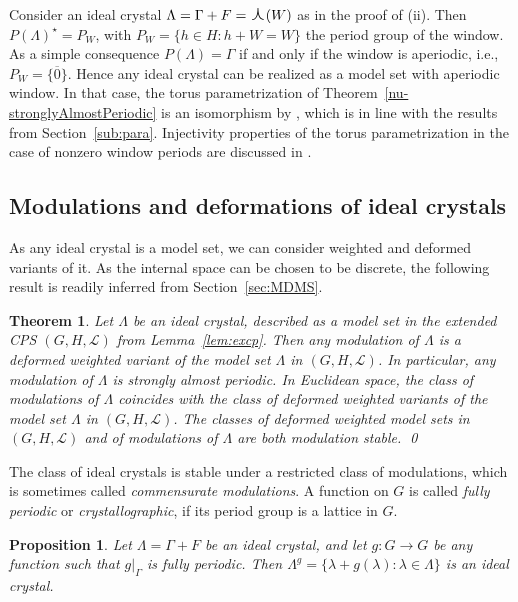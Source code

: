 \documentclass[11pt, a4wide]{amsart}
\newcommand{\oplam}{\mbox{\Large $\curlywedge$}}
\newcommand{\cL}{\mathcal L}
\newtheorem{theorem}[lemma]{Theorem}
\newtheorem{proposition}[lemma]{Proposition}
\numberwithin{lemma}{section}
\begin{document}
Consider an ideal crystal $\Lambda=\Gamma+F=\oplam(W)$ as in the proof of (ii). Then $P(\Lambda)^\star=P_W$, with $P_W=\{h\in H: h+W=W\}$ the period group of the window. As a simple consequence $P(\Lambda)=\Gamma$ if and only if the window is aperiodic, i.e., $P_W=\{\overline{0}\}$. Hence any ideal crystal can be realized as a model set with aperiodic window.
In that case, the torus parametrization of Theorem~\ref{nu-stronglyAlmostPeriodic} is an isomorphism by \cite[Prop.~13.2]{LR}, which is in line with the results from Section~\ref{sub:para}. Injectivity properties of the torus parametrization in the case of nonzero window periods are discussed in \cite{KR17}.

\subsection{Modulations and deformations of ideal crystals}

As any ideal crystal is a model set, we can consider weighted and deformed variants of it. As the internal space can be chosen to be discrete, the following result is readily inferred from Section~\ref{sec:MDMS}.

\begin{theorem}
Let $\Lambda$ be an ideal crystal, described as a model set in the extended CPS $(G,H, \cL)$ from Lemma~\ref{lem:excp}. Then any modulation of $\Lambda$ is a deformed weighted variant of  the model set $\Lambda$ in $(G,H,\cL)$.  In particular,  any modulation of $\Lambda$ is strongly almost periodic.    In Euclidean space, the class of modulations of $\Lambda$ coincides with the class of deformed weighted variants of the model set $\Lambda$ in $(G,H, \cL)$. The classes of deformed weighted model sets in $(G,H,\cL)$ and of modulations of $\Lambda$ are both modulation stable. \qed
\end{theorem}



\smallskip

The class of ideal crystals is stable under a restricted class of modulations, which is sometimes called \textit{commensurate modulations}. A function on $G$ is called \textit{fully periodic} or \textit{crystallographic}, if its period group is a lattice in $G$.

\begin{proposition}\label{prop:icms}
Let $\Lambda=\Gamma+F$ be an ideal crystal, and let $g:G\to G$ be any function such that $g|_\Gamma$ is fully periodic. Then $\Lambda^g=\{\lambda+g(\lambda): \lambda\in \Lambda\}$ is an ideal crystal.
\end{proposition}
\end{document}
